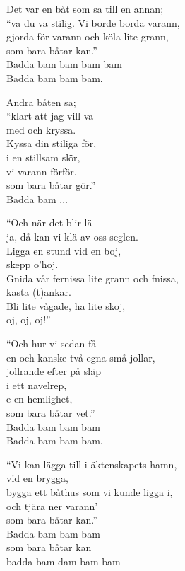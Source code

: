 \vspace{10pt}
Det var en båt som sa till en annan;\\
``va du va stilig. Vi borde borda varann,\\
gjorda för varann och köla lite grann,\\
som bara båtar kan.''\\
Badda bam bam bam bam\\
Badda bam bam bam.\par
\vspace{10pt}
Andra båten sa;\\
``klart att jag vill va\\
med och kryssa.\\
Kyssa din stiliga för,\\
i en stillsam slör,\\
vi varann förför.\\
som bara båtar gör.''\\
Badda bam ...\par
\vspace{10pt}
``Och när det blir lä\\
ja, då kan vi klä av oss seglen.\\
Ligga en stund vid en boj,\\
skepp o'hoj.\\
Gnida vår fernissa lite grann och fnissa,\\
kasta (t)ankar.\\
Bli lite vågade, ha lite skoj,\\
oj, oj, oj!''\par
\newpage
``Och hur vi sedan få\\
en och kanske två egna små jollar,\\
jollrande efter på släp\\
i ett navelrep,\\
e en hemlighet,\\
som bara båtar vet.''\\
Badda bam bam bam\\
Badda bam bam bam.\par
\vspace{10pt}
``Vi kan lägga till i äktenskapets hamn,\\
vid en brygga,\\
bygga ett båthus som vi kunde ligga i,\\
och tjära ner varann'\\
som bara båtar kan.''\\
Badda bam bam bam\\
som bara båtar kan\\
badda bam dam bam bam
